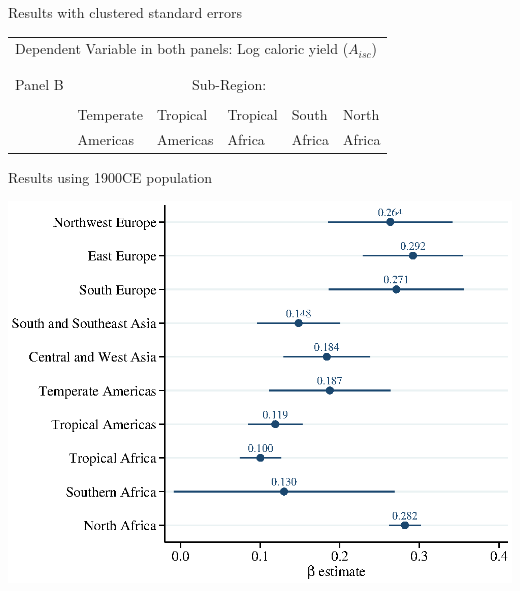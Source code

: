 \documentclass[10pt, xcolor=dvipsnames]{beamer}
\begin{document}
\begin{frame}{Results with clustered standard errors}

{\scriptsize
\begin{tabularx}{\textwidth}{lXXXXX}
\midrule
\multicolumn{6}{l}{Dependent Variable in both panels: Log caloric yield ($A_{isc}$)} \\ \\
\\
Panel B & \multicolumn{5}{c}{Sub-Region:} \\ \cmidrule{2-6}
 &           &   &           &          &             \\
 & Temperate & Tropical  & Tropical & South    & North    \\
 & Americas  & Americas  & Africa   & Africa   & Africa     \\
\midrule

\midrule
\end{tabularx}
}

\hfill \hyperlink{robustness}{}
\end{frame}


\begin{frame}{Results using 1900CE population}\label{reg1900}
\begin{center}
\includegraphics[width=.8\textwidth]{fig_coef_subregion_pop1900.eps}
\end{center}
\hfill \hyperlink{robustness}{}
\end{frame}
\end{document}
